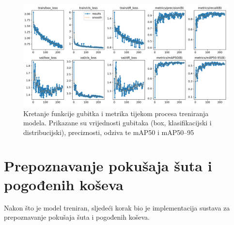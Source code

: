 \documentclass[zavrsnirad]{fer}
\begin{document}
\begin{figure}[H]
  \centering
  \includegraphics[width=\linewidth]{Figures/results.png}
  \caption{Kretanje funkcije gubitka i metrika tijekom procesa treniranja modela. Prikazane su vrijednosti gubitaka (box, klasifikacijski i distribucijski), preciznosti, odziva te mAP50 i mAP50–95 }
  \label{fig:training_results}
\end{figure}

\section{Prepoznavanje pokušaja šuta i pogođenih koševa}
\label{pog:prepoznavanje_pokusaja_suta_i_pogodenih_koseva}
Nakon što je model treniran, sljedeći korak bio je implementacija sustava za prepoznavanje pokušaja šuta i pogođenih koševa.
\end{document}
